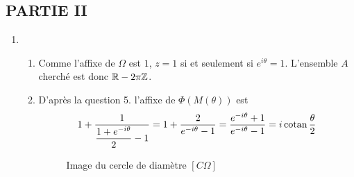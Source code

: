 \subsection*{PARTIE II}
\begin{enumerate}
 \item\begin{enumerate}
 \item Comme l'affixe de $\Omega$ est $1$, $z=1$ si et seulement si $e^{i\theta}=1$. L'ensemble $A$ cherché est donc $\mathbb{R}-2\pi\mathbb{Z}$.
\item D'après la question 5. l'affixe de $\Phi(M(\theta))$ est
\begin{displaymath}
1+\dfrac{1}{\dfrac{1+e^{-i\theta}}{2}-1}=1+\dfrac{2}{e^{-i\theta}-1}
=\dfrac{e^{-i\theta}+1}{e^{-i\theta}-1}=i\operatorname{cotan}\frac{\theta}{2}
\end{displaymath}
\begin{figure}[ht]
 \centering

\caption{Image du cercle de diamètre $[C\Omega]$}
\label{Cinv2_1}
\end{figure}


\end{enumerate}
\end{enumerate}
